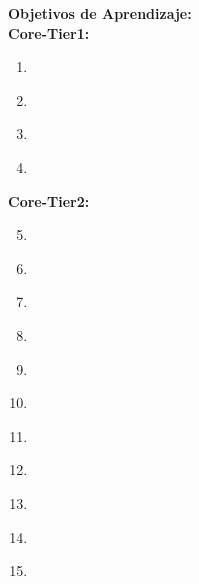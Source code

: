 \noindent \textbf{Objetivos de Aprendizaje:}\\
\noindent \textbf{Core-Tier1:}
\begin{enumerate}
	\setcounter{enumi}{0}
	\item \SESoftwareDesignLOArticulateDesign\xspace[\SESoftwareDesignLOArticulateDesignLevel]\label{sec:BOK:SESoftwareDesignLOArticulateDesign}
	\item \SESoftwareDesignLOUseAToSimple\xspace[\SESoftwareDesignLOUseAToSimpleLevel]\label{sec:BOK:SESoftwareDesignLOUseAToSimple}
	\item \SESoftwareDesignLOConstructModels\xspace[\SESoftwareDesignLOConstructModelsLevel]\label{sec:BOK:SESoftwareDesignLOConstructModels}
	\item \SESoftwareDesignLOWithin\xspace[\SESoftwareDesignLOWithinLevel]\label{sec:BOK:SESoftwareDesignLOWithin}
\end{enumerate}
\noindent \textbf{Core-Tier2:}
\begin{enumerate}
	\setcounter{enumi}{4}
	\item \SESoftwareDesignLOForASuitable\xspace[\SESoftwareDesignLOForASuitableLevel]\label{sec:BOK:SESoftwareDesignLOForASuitable}
	\item \SESoftwareDesignLOCreateAppropriate\xspace[\SESoftwareDesignLOCreateAppropriateLevel]\label{sec:BOK:SESoftwareDesignLOCreateAppropriate}
	\item \SESoftwareDesignLOExplainTheTheA\xspace[\SESoftwareDesignLOExplainTheTheALevel]\label{sec:BOK:SESoftwareDesignLOExplainTheTheA}
	\item \SESoftwareDesignLOForThe\xspace[\SESoftwareDesignLOForTheLevel]\label{sec:BOK:SESoftwareDesignLOForThe}
	\item \SESoftwareDesignLOGiven\xspace[\SESoftwareDesignLOGivenLevel]\label{sec:BOK:SESoftwareDesignLOGiven}
	\item \SESoftwareDesignLOInvestigateThe\xspace[\SESoftwareDesignLOInvestigateTheLevel]\label{sec:BOK:SESoftwareDesignLOInvestigateThe}
	\item \SESoftwareDesignLOApplySimple\xspace[\SESoftwareDesignLOApplySimpleLevel]\label{sec:BOK:SESoftwareDesignLOApplySimple}
	\item \SESoftwareDesignLODescribeARefactoring\xspace[\SESoftwareDesignLODescribeARefactoringLevel]\label{sec:BOK:SESoftwareDesignLODescribeARefactoring}
	\item \SESoftwareDesignLOSelectSuitable\xspace[\SESoftwareDesignLOSelectSuitableLevel]\label{sec:BOK:SESoftwareDesignLOSelectSuitable}
	\item \SESoftwareDesignLOExplainHowMight\xspace[\SESoftwareDesignLOExplainHowMightLevel]\label{sec:BOK:SESoftwareDesignLOExplainHowMight}
	\item \SESoftwareDesignLODesignAA\xspace[\SESoftwareDesignLODesignAALevel]\label{sec:BOK:SESoftwareDesignLODesignAA}
\end{enumerate}
